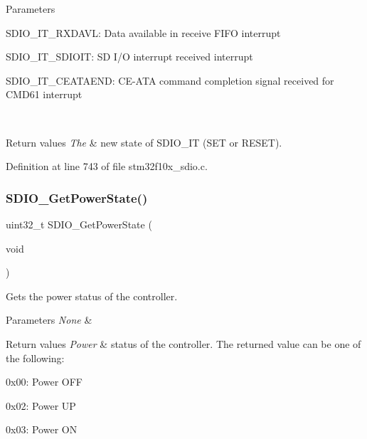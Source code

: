 \begin{DoxyParams}{Parameters}
\begin{DoxyItemize}
S\+D\+I\+O\+\_\+\+I\+T\+\_\+\+R\+X\+D\+A\+VL\+: Data available in receive F\+I\+FO interrupt \item S\+D\+I\+O\+\_\+\+I\+T\+\_\+\+S\+D\+I\+O\+IT\+: SD I/O interrupt received interrupt \item S\+D\+I\+O\+\_\+\+I\+T\+\_\+\+C\+E\+A\+T\+A\+E\+ND\+: C\+E-\/\+A\+TA command completion signal received for C\+M\+D61 interrupt \end{DoxyItemize}
\\
\hline
\end{DoxyParams}

\begin{DoxyRetVals}{Return values}
{\em The} & new state of S\+D\+I\+O\+\_\+\+IT (S\+ET or R\+E\+S\+ET). \\
\hline
\end{DoxyRetVals}


Definition at line 743 of file stm32f10x\+\_\+sdio.\+c.

\mbox{\label{group___s_d_i_o___exported___functions_ga3a19de2c7cd51645702213f64a1758ed}} 
\subsubsection{\texorpdfstring{S\+D\+I\+O\+\_\+\+Get\+Power\+State()}{SDIO\_GetPowerState()}}
{\footnotesize\ttfamily uint32\+\_\+t S\+D\+I\+O\+\_\+\+Get\+Power\+State (\begin{DoxyParamCaption}\item[{void}]{ }\end{DoxyParamCaption})}



Gets the power status of the controller. 


\begin{DoxyParams}{Parameters}
{\em None} & \\
\hline
\end{DoxyParams}

\begin{DoxyRetVals}{Return values}
{\em Power} & status of the controller. The returned value can be one of the following\+:
\begin{DoxyItemize}
\item 0x00\+: Power O\+FF
\item 0x02\+: Power UP
\item 0x03\+: Power ON 
\end{DoxyItemize}\\
\hline
\end{DoxyRetVals}


